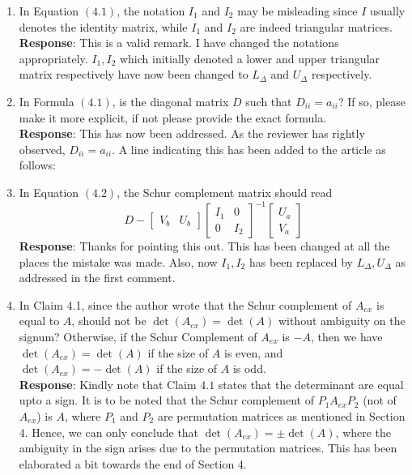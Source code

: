 \documentclass{article}
\begin{document}
\begin{enumerate}
	\item
	In Equation $(4.1)$, the notation $I_1$ and $I_2$ may be misleading since $I$ usually denotes the identity matrix, while $I_1$ and $I_2$ are indeed triangular matrices.\\
	{\color{blue}\textbf{Response}: This is a valid remark. I have changed the notations appropriately. $I_1,I_2$ which initially denoted a lower and upper triangular matrix respectively have now been changed to $L_{\Delta}$ and $U_{\Delta}$ respectively.}

\hrulefill

	\item
	In Formula $(4.1)$, is the diagonal matrix $D$ such that $D_{ii} = a_{ii}$? If so, please make it more explicit, if not please provide the exact formula.\\
	{\color{blue}\textbf{Response}: This has now been addressed. As the reviewer has rightly observed, $D_{ii} = a_{ii}$. A line indicating this has been added to the article as follows: }

\hrulefill

	
	\item
	In Equation $(4.2)$, the Schur complement matrix should read
	$$D-
	\begin{bmatrix} V_b & U_b \end{bmatrix} \begin{bmatrix} I_1 & 0\\ 0 & I_2\end{bmatrix}^{-1}
	\begin{bmatrix} U_a\\ V_a \end{bmatrix}$$
	{\color{blue}\textbf{Response}: Thanks for pointing this out. This has been changed at all the places the mistake was made. Also, now $I_1,I_2$ has been replaced by $L_{\Delta},U_{\Delta}$ as addressed in the first comment.}

\hrulefill

	
	\item
	In Claim 4.1, since the author wrote that the Schur complement of $A_{ex}$ is equal to $A$, should not be $\det(A_{ex}) = \det(A)$ without ambiguity on the signum? Otherwise, if the Schur Complement of $A_{ex}$ is $-A$, then we have $\det(A_{ex}) = \det(A)$ if the size of $A$ is even, and $\det(A_{ex}) = −\det(A)$ if the size of $A$ is odd.\\
	{\color{blue}\textbf{Response}: Kindly note that Claim $4.1$ states that the determinant are equal upto a sign. It is to be noted that the Schur complement of $P_1A_{ex}P_2$ (not of $A_{ex}$) is $A$, where $P_1$ and $P_2$ are permutation matrices as mentioned in Section $4$. Hence, we can only conclude that $\det(A_{ex}) = \pm \det(A)$, where the ambiguity in the sign arises due to the permutation matrices. This has been elaborated a bit towards the end of Section $4$.}


\end{enumerate}
\end{document}
